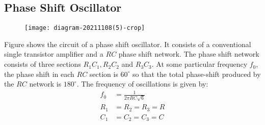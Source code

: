 \subsection{Phase Shift Oscillator}
 \begin{figure}[H]
 	\centering
 	\texttt{[image: diagram-20211108(5)-crop]}
 	\caption{}
 	\label{}
 \end{figure}
 Figure shows the circuit of a phase shift oscillator. It consists of a conventional single transistor amplifier and a $R C$ phase shift network. The phase shift network consists of three sections $R_{1} C_{1}, R_{2} C_{2}$ and $R_{3} C_{3} .$ At some particular frequency $f_{0}$, the phase shift in each $R C$ section is $60^{\circ}$ so that the total phase-shift produced by the $R C$ network is $180^{\circ} .$ The frequency of oscillations is given by:
 $$\begin{aligned}
 	f_{0} &=\frac{1}{2 \pi R C \sqrt{6}} \\
 	R_{1} &=R_{2}=R_{3}=R \\
 	C_{1} &=C_{2}=C_{3}=C
 \end{aligned}$$
